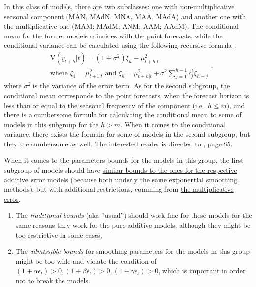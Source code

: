 \documentclass[
]{book}
\providecommand{\tightlist}{%
  \setlength{\itemsep}{0pt}\setlength{\parskip}{0pt}}
\theoremstyle{definition}
\theoremstyle{definition}
\theoremstyle{definition}
\theoremstyle{definition}
\theoremstyle{remark}
\begin{document}
In this class of models, there are two subclasses: one with non-multiplicative seasonal component (MAN, MAdN, MNA, MAA, MAdA) and another one with the multiplicative one (MAM; MAdM; ANM; AAM; AAdM). The conditional mean for the former models coincides with the point forecasts, while the conditional variance can be calculated using the following recursive formula \citep{Hyndman2008b}:
\begin{equation}
    \begin{aligned}
    & \text{V}(y_{t+h}|t) = (1+\sigma^2) \xi_h - \mu_{t+h|t}^2 \\
    & \text{where } \xi_{1} = \mu_{t+1|t}^2 \text{ and } \xi_h = \mu_{t+h|t}^2 + \sigma^2 \sum_{j=1}^{h-1} c_{j}^2 \xi_{h-j}
    \end{aligned} ,
    \label{eq:ETSADAMMixedModels31Variance}
\end{equation}
where \(\sigma^2\) is the variance of the error term. As for the second subgroup, the conditional mean corresponds to the point forecasts, when the forecast horizon is less than or equal to the seasonal frequency of the component (i.e.~\(h\leq m\)), and there is a cumbersome formula for calculating the conditional mean to some of models in this subgroup for the \(h>m\). When it comes to the conditional variance, there exists the formula for some of models in the second subgroup, but they are cumbersome as well. The interested reader is directed to \citet{Hyndman2008b}, page 85.

When it comes to the parameters bounds for the models in this group, the first subgroup of models should have \protect\hyperlink{stabilityConditionAdditiveError}{similar bounds to the ones for the respective additive error} models (because both underly the same exponential smoothing methods), but with additional restrictions, comming from \protect\hyperlink{stabilityConditionMultiplicativeError}{the multiplicative error}.

\begin{enumerate}
\def\labelenumi{\arabic{enumi}.}
\tightlist
\item
  The \emph{traditional bounds} (aka ``usual'') should work fine for these models for the same reasons they work for the pure additive models, although they might be too restrictive in some cases;
\item
  The \emph{admissible bounds} for smoothing parameters for the models in this group might be too wide and violate the condition of \((1+ \alpha \epsilon_t)>0, (1+ \beta \epsilon_t)>0, (1+ \gamma \epsilon_t)>0\), which is important in order not to break the models.
\end{enumerate}
\end{document}
